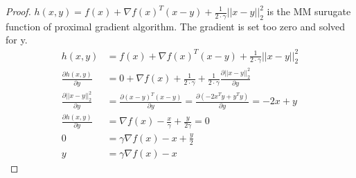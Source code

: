 	\begin{proof}
		$h(x,y) = f(x) + \nabla f(x)^T(x-y) + \frac{1}{2 \cdot \gamma}||x-y||^2_2$ is the MM surugate function of proximal gradient algorithm. The gradient is set too zero and solved for y.
		\begin{align*}
		h(x,y)
		& = f(x) + \nabla f(x)^T(x-y) + \frac{1}{2 \cdot \gamma}||x-y||^2_2 \\
		\frac{\partial h(x,y)}{\partial y}
		& = 0 + \nabla f(x) + \frac{1}{2 \cdot \gamma} + \frac{1}{2 \cdot \gamma}\frac{\partial ||x-y||^2_2}{\partial y}  \\	
		\frac{\partial ||x-y||^2_2}{\partial y}
		& = \frac{\partial(x-y)^T(x-y)}{\partial y} = \frac{\partial(-2x^Ty + y^Ty)}{\partial y} = -2x+y \\
		\frac{\partial h(x,y)}{\partial y}
		& = \nabla f(x) - \frac{x}{\gamma} + \frac{y}{2 \gamma} = 0 \\
		0
		& = \gamma \nabla f(x) - x + \frac{y}{2} \\
		y & = \gamma \nabla f(x) - x
		\end{align*}
		\label{prf:proximal gradient as MM}
	\end{proof}